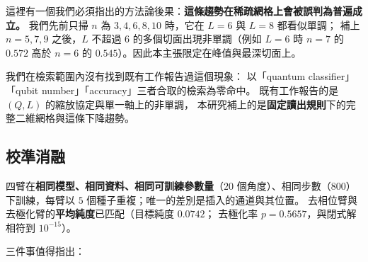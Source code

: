 \documentclass[11pt,a4paper]{ctexart}
\begin{document}
這裡有一個我們必須指出的方法論後果：\textbf{這條趨勢在稀疏網格上會被誤判為普遍成立。}
我們先前只掃 \(n\) 為 \(3,4,6,8,10\) 時，它在 \(L = 6\) 與 \(L = 8\)
都看似單調； 補上 \(n = 5,7,9\) 之後，\(L\) 不超過 \(6\)
的多個切面出現非單調（例如 \(L = 6\) 時 \(n = 7\) 的 \(0.572\) 高於
\(n = 6\) 的 \(0.545\)）。因此本主張限定在峰值與最深切面上。

我們在檢索範圍內沒有找到既有工作報告過這個現象： 以「quantum
classifier」「qubit number」「accuracy」三者合取的檢索為零命中。
既有工作報告的是 \((Q,L)\) 的縮放協定與單一軸上的非單調，
本研究補上的是\textbf{固定讀出規則}下的完整二維網格與這條下降趨勢。

\subsection{校準消融}

四臂在\textbf{相同模型、相同資料、相同可訓練參數量}（\(20\)
個角度）、相同步數（\(800\)） 下訓練，每臂以 \(5\)
個種子重複；唯一的差別是插入的通道與其位置。
去相位臂與去極化臂的\textbf{平均純度}已匹配（目標純度 \(0.0742\)；
去極化率 \(p = 0.5657\)，與閉式解相符到 \(10^{- 15}\)）。

\begin{table}[t]
\centering
\caption{校準消融。臂 C 的每一項預測指標都與臂 A 逐位元相同，但態純度是
\(0.1230\) 對
\(1.0000\)：計算基底測量只讀對角元，所以尾端去相位改變了狀態，卻不改變任何可觀測的結果。}
\end{table}


三件事值得指出：
\end{document}
